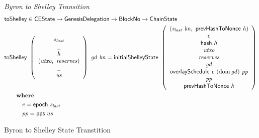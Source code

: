 \begin{figure}[htb]
  \emph{Byron to Shelley Transition}
  \begin{align*}
      & \fun{toShelley} \in \CEState \to \GenesisDelegation \to \BlockNo \to \ChainState \\
      & \fun{toShelley}~
      \left(
        \begin{array}{c}
          \var{s_{last}} \\
          \wcard \\
          \var{h} \\
          (\var{utxo},~\var{reserves}) \\
          \wcard \\
          \var{us}
        \end{array}
      \right)~\var{gd}~\var{bn}
      =
      \fun{initialShelleyState}~
      \left(
        \begin{array}{c}
          (\var{s_{last}}~\var{bn},~\prevHashToNonce{h}) \\
          e \\
          \fun{hash}~{h} \\
          \var{utxo} \\
          \var{reserves} \\
          \var{gd} \\
          \overlaySchedule{e}{(\dom{gd})}{pp} \\
          \var{pp} \\
          \prevHashToNonce{h} \\
        \end{array}
      \right) \\
      & ~~~~\where \\
      & ~~~~~~~~~e = \epoch{s_{last}} \\
      & ~~~~~~~~~pp = \fun{pps}~{us} \\   %
  \end{align*}

  \caption{Byron to Shelley State Transtition}
  \label{fig:functions:to-shelley}
\end{figure}

